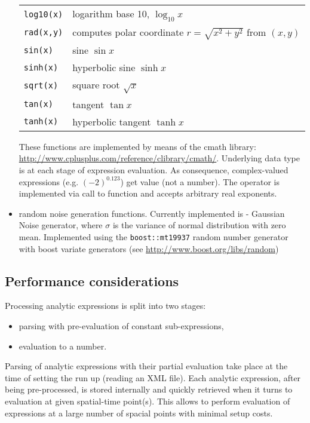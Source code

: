 \begin{itemize}
\begin{center}
\begin{tabular}{ll}
  \texttt{log10(x)}   & logarithm base 10, $\log_{10} x$ \\
  \texttt{rad(x,y)}   & computes polar coordinate $r=\sqrt{x^2+y^2}$ from $(x,y)$\\
  \texttt{sin(x)}     & sine $\sin x$ \\
  \texttt{sinh(x)}    & hyperbolic sine $\sinh x$ \\
  \texttt{sqrt(x)}    & square root $\sqrt{x}$ \\
  \texttt{tan(x)}     & tangent $\tan x$ \\
  \texttt{tanh(x)}    & hyperbolic tangent $\tanh x$ \\
  \bottomrule
\end{tabular}
\end{center}

These functions are implemented by means of the cmath library:
\url{http://www.cplusplus.com/reference/clibrary/cmath/}. Underlying data type
is  at each stage of expression evaluation. As consequence,
complex-valued expressions (e.g. $(-2)^0.123$) get value  (not a
number). The operator \inlsh{\^} is implemented via call to 
function and accepts arbitrary real exponents.

\item random noise generation functions. Currently implemented is
 - Gaussian Noise generator, where $\sigma$ is the variance
of normal distribution with zero mean. Implemented using the
\texttt{boost::mt19937} random number generator with boost variate generators
(see \url{http://www.boost.org/libs/random})
\end{itemize}

\subsection{Performance considerations}
Processing analytic expressions is split into two stages:
\begin{itemize}
\item parsing with pre-evaluation of constant sub-expressions,
\item evaluation to a number.
\end{itemize}
Parsing of analytic expressions with their partial evaluation take place at the
time of setting the run up (reading an XML file). Each analytic expression,
after being pre-processed, is stored internally and quickly retrieved when it
turns to evaluation at given spatial-time point(s). This allows to perform
evaluation of expressions at a large number of spacial points with minimal setup
costs.

